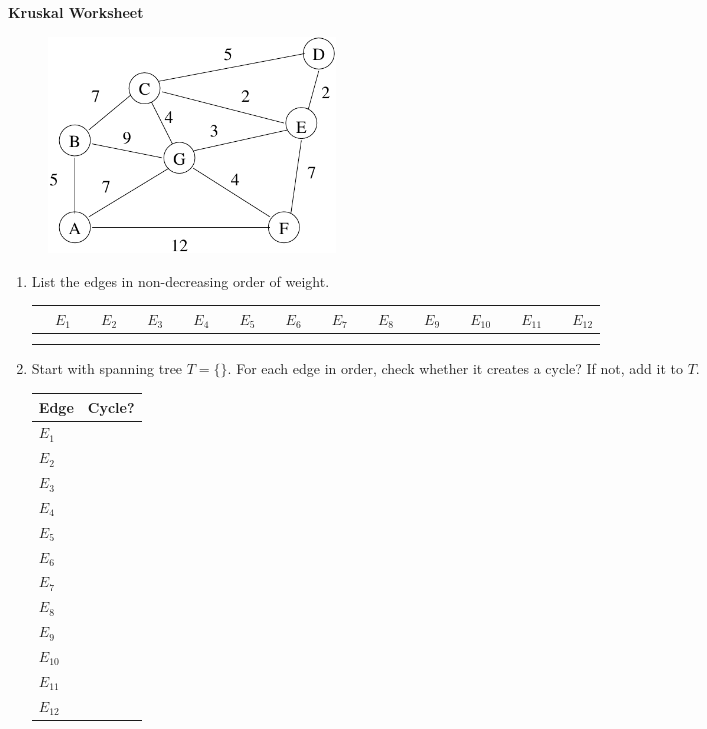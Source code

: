 \documentclass[12pt]{article}
\begin{document}
\newcommand{\lsp}[1]{\large\renewcommand{\baselinestretch}{#1}\normalsize}

\lsp{1}
\pagestyle{plain}
\begin{center}
{\bf
Kruskal Worksheet
}
\end{center}

\begin{figure}[h]
\center
\includegraphics[width = 3in]{spanning.pdf}
\end{figure}

\begin{enumerate}
\item List the edges in non-decreasing order of weight.

\begin{tabular}{|c|c|c|c|c|c|c|c|c|c|c|c|} \hline
~~$E_1$ & ~~$E_2$ & ~~$E_3$ & ~~$E_4$ & ~~$E_5$ & ~~$E_6$ & ~~$E_7$ & ~~$E_8$ & ~~$E_9$ & ~~$E_{10}$ & ~~$E_{11}$ & ~~$E_{12}$ \\ \hline
 & & & & & & & & & & & \\ 
 & & & & & & & & & & & \\ \hline 
\end{tabular}

\item Start with spanning tree $T = \{ \}$. For each edge in order, 
check whether it creates a cycle? If not, add it to $T$.

\begin{tabular}{|l|c|} \hline
Edge  & Cycle?\\ \hline
$E_1$ & \\ \hline
$E_2$  & \\ \hline
$E_3$ & \\ \hline
$E_4$ & \\ \hline
$E_5$ & \\ \hline
$E_6$ & \\ \hline
$E_7$ & \\ \hline
$E_8$ & \\ \hline
$E_9$ & \\ \hline
$E_{10}$ & \\ \hline
$E_{11}$ & \\ \hline
$E_{12}$ & \\ \hline
\end{tabular}

\end{enumerate}
\end{document}
